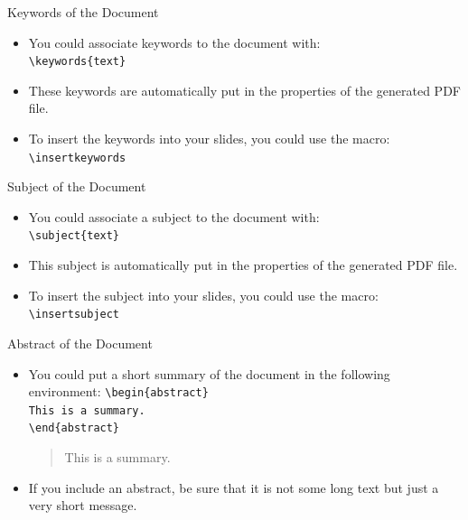 \documentclass[english,sectioncirclenumberstyle]{ciadbeamer}
\begin{document}
\begin{frame}{Keywords of the Document}
	\begin{itemize}
	\item You could associate keywords to the document with: \\
		\texttt{{\textbackslash}keywords\{text\}}
	\vspace{1em}
	\item These keywords are automatically put in the properties of the generated PDF file.
	\vspace{1em}
	\item To insert the keywords into your slides, you could use the macro: \\
			\texttt{{\textbackslash}insertkeywords}
	\end{itemize}
	\begin{example}
		\insertkeywords
	\end{example}
\end{frame}

\begin{frame}{Subject of the Document}
	\begin{itemize}
	\item You could associate a subject to the document with: \\
		\texttt{{\textbackslash}subject\{text\}}
	\vspace{1em}
	\item This subject is automatically put in the properties of the generated PDF file.
	\vspace{1em}
	\item To insert the subject into your slides, you could use the macro: \\
			\texttt{{\textbackslash}insertsubject}
	\end{itemize}
	\begin{example}
		\insertsubject
	\end{example}
\end{frame}

\begin{frame}{Abstract of the Document}
	\begin{itemize}
	\item You could put a short summary of the document in the following environment:
		\texttt{{\textbackslash}begin\{abstract\}} \\
		\texttt{This is a summary.} \\
		\texttt{{\textbackslash}end\{abstract\}}
	\vspace{1em}
	\begin{abstract}
		This is a summary.
	\end{abstract}
	\item If you include an abstract, be sure that it is not some long text but just a very short message.
	\end{itemize}
\end{frame}
\end{document}
